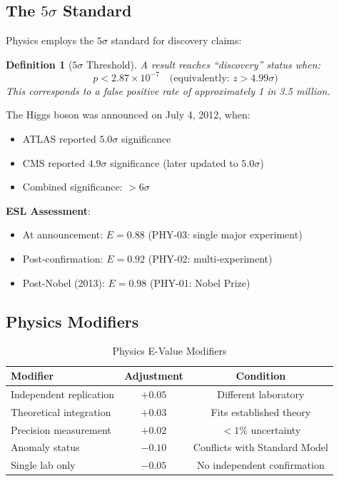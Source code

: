 \documentclass[11pt,a4paper]{article}
\newtheorem{definition}{Definition}[section]
\theoremstyle{remark}
\begin{document}
\subsection{The $5\sigma$ Standard}

Physics employs the $5\sigma$ standard for discovery claims:

\begin{definition}[$5\sigma$ Threshold]
\label{def:5sigma}
A result reaches ``discovery'' status when:
\begin{equation}
p < 2.87 \times 10^{-7} \quad \text{(equivalently: } z > 4.99\sigma\text{)}
\end{equation}
This corresponds to a false positive rate of approximately 1 in 3.5 million.
\end{definition}

\begin{examplebox}[title={Higgs Boson Discovery (2012)}]
The Higgs boson was announced on July 4, 2012, when:
\begin{itemize}
    \item ATLAS reported $5.0\sigma$ significance
    \item CMS reported $4.9\sigma$ significance (later updated to $5.0\sigma$)
    \item Combined significance: $>6\sigma$
\end{itemize}

\textbf{ESL Assessment}:
\begin{itemize}
    \item At announcement: $E = 0.88$ (PHY-03: single major experiment)
    \item Post-confirmation: $E = 0.92$ (PHY-02: multi-experiment)
    \item Post-Nobel (2013): $E = 0.98$ (PHY-01: Nobel Prize)
\end{itemize}
\end{examplebox}

\subsection{Physics Modifiers}

\begin{table}[h]
\centering
\caption{Physics E-Value Modifiers}
\label{tab:physics-modifiers}
\begin{tabular}{lcc}
\toprule
\textbf{Modifier} & \textbf{Adjustment} & \textbf{Condition} \\
\midrule
Independent replication & $+0.05$ & Different laboratory \\
Theoretical integration & $+0.03$ & Fits established theory \\
Precision measurement & $+0.02$ & $<1\%$ uncertainty \\
Anomaly status & $-0.10$ & Conflicts with Standard Model \\
Single lab only & $-0.05$ & No independent confirmation \\
\bottomrule
\end{tabular}
\end{table}
\end{document}
